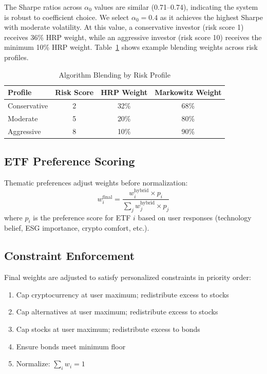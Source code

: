 \documentclass[11pt]{article}
\begin{document}
The Sharpe ratios across $\alpha_0$ values are similar (0.71--0.74), indicating the system is robust to coefficient choice. We select $\alpha_0 = 0.4$ as it achieves the highest Sharpe with moderate volatility. At this value, a conservative investor (risk score 1) receives 36\% HRP weight, while an aggressive investor (risk score 10) receives the minimum 10\% HRP weight. Table~\ref{tab:blend-examples} shows example blending weights across risk profiles.

\begin{table}[H]
\centering
\caption{Algorithm Blending by Risk Profile}
\label{tab:blend-examples}
\begin{tabular}{lccc}
\toprule
\textbf{Profile} & \textbf{Risk Score} & \textbf{HRP Weight} & \textbf{Markowitz Weight} \\
\midrule
Conservative & 2 & 32\% & 68\% \\
Moderate & 5 & 20\% & 80\% \\
Aggressive & 8 & 10\% & 90\% \\
\bottomrule
\end{tabular}
\end{table}

\subsection{ETF Preference Scoring}

Thematic preferences adjust weights before normalization:
\begin{equation}
w_i^{\text{final}} = \frac{w_i^{\text{hybrid}} \times p_i}{\sum_j w_j^{\text{hybrid}} \times p_j}
\end{equation}
where $p_i$ is the preference score for ETF $i$ based on user responses (technology belief, ESG importance, crypto comfort, etc.).

\subsection{Constraint Enforcement}

Final weights are adjusted to satisfy personalized constraints in priority order:
\begin{enumerate}
\item Cap cryptocurrency at user maximum; redistribute excess to stocks
\item Cap alternatives at user maximum; redistribute excess to stocks
\item Cap stocks at user maximum; redistribute excess to bonds
\item Ensure bonds meet minimum floor
\item Normalize: $\sum_i w_i = 1$
\end{enumerate}
\end{document}
